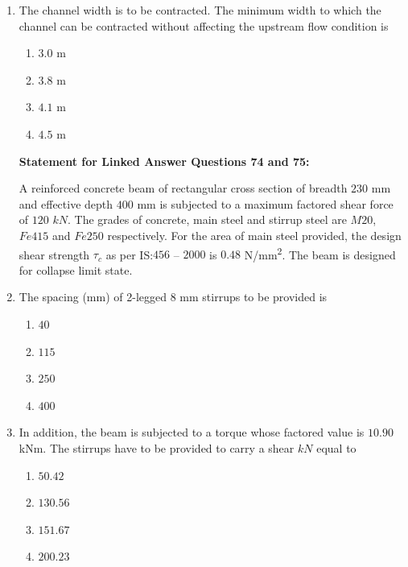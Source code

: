 \documentclass[journal]{IEEEtran}
\begin{document}
\begin{enumerate}
\item The channel width is to be contracted. The minimum width to which the channel can be contracted without affecting the upstream flow condition is \hfill {}

\begin{enumerate}
\item $3.0$ m
\item $3.8$ m
\item $4.1$ m
\item $4.5$ m
\end{enumerate}

\vspace{1cm}

\textbf{Statement for Linked Answer Questions 74 and 75:}

A reinforced concrete beam of rectangular cross section of breadth $230$ mm and effective depth $400$ mm is subjected to a maximum factored shear force of $120$ $kN$. The grades of concrete, main steel and stirrup steel are $M20$, $Fe415$ and $Fe250$ respectively. For the area of main steel provided, the design shear strength $\tau_c$ as per IS:$456$ --  $2000$ is $0.48$ N/mm\textsuperscript{2}. The beam is designed for collapse limit state.

\vspace{0.5cm}

\item The spacing (mm) of 2-legged 8 mm stirrups to be provided is \hfill {}
\begin{enumerate}
\item $40$
\item $115$
\item $250$
\item $400$
\end{enumerate}

\vspace{0.5cm}

\item  In addition, the beam is subjected to a torque whose factored value is $10.90$ kNm. The stirrups have to be provided to carry a shear $kN$ equal to \hfill {}
\begin{enumerate}
\item $50.42$
\item $130.56$
\item $151.67$
\item $200.23$
\end{enumerate}


\end{enumerate}
\end{document}
